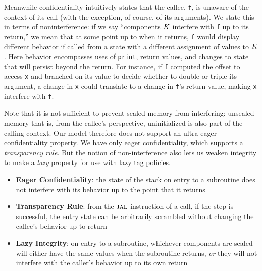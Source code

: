 Meanwhile confidentiality intuitively states that the callee, {\tt f}, is unaware
of the context of its call (with the exception, of course, of its arguments).
We state this in terms of noninterference: if we say ``components \(K\)
interfere with {\tt f} up to its return,'' we mean that at some point up to when it returns,
{\tt f} would display different behavior if called from a state with a different
assignment of values to \(K\). Here behavior encompasses uses of {\tt print},
return values, and changes to state that will persist beyond the return.
For instance, if {\tt f} computed the offset to access {\tt x} and branched on its value
to decide whether to double or triple its argument, a change in {\tt x} could translate
to a change in {\tt f}'s return value, making {\tt x} interfere with {\tt f}.

Note that it is not sufficient to prevent sealed memory from interfering: unsealed
memory that is, from the callee's perspective, uninitialized is also part of the calling
context. Our model therefore does not support an ultra-eager confidentiality property.
We have only eager confidentiality, which supports a {\em transparency rule}. But the
notion of non-interference also lets us weaken integrity to make a {\em lazy} property
for use with lazy tag policies.

\begin{itemize}
\item {\bf Eager Confidentiality}: the state of the stack on entry to a subroutine
  does not interfere with its behavior up to the point that it returns
\item {\bf Transparency Rule}: from the \(\textsc{jal}\) instruction of a call, if the step is
  successful, the entry state can be arbitrarily scrambled without changing the callee's
  behavior up to return
\item {\bf Lazy Integrity}:  on entry to a subroutine, whichever components are
  sealed will either have the same values when the subroutine returns, {\em or} they will
  not interfere with the caller's behavior up to its own return
\end{itemize}
